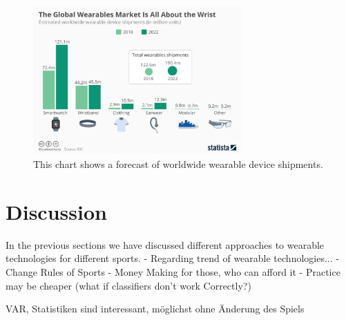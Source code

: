 \documentclass[sigconf]{acmart}
\begin{document}
	 \begin{figure}\centering
	 	\includegraphics[width=8cm]{Images/Statista.jpg}
	 	\caption{This chart shows a forecast of worldwide wearable device shipments.  \cite{Statista}}
	 	\label{fig:Statista}
	 \end{figure}
 
	\section{Discussion}\label{sec:Discussion}
	In the previous sections we have discussed different approaches to wearable technologies for different sports. 
	- Regarding trend of wearable technologies...
	- Change Rules of Sports
	- Money Making for those, who can afford it
	- Practice may be cheaper (what if classifiers don't work Correctly?)
	
	
	
	
	VAR, Statistiken sind interessant, möglichst ohne Änderung des Spiels
	
	
	
	

	
\end{document}
